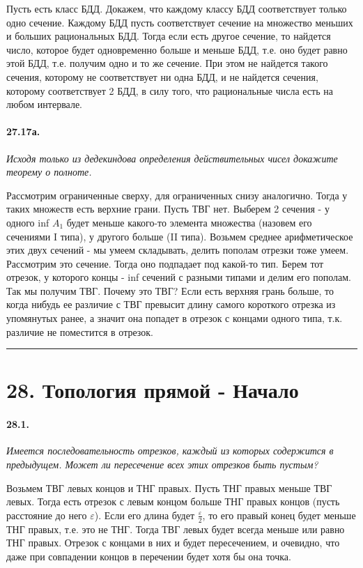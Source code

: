 \documentclass{book}
\begin{document}
Пусть есть класс БДД. Докажем, что каждому классу БДД соответствует только одно сечение. Каждому БДД пусть соответствует сечение на множество меньших и больших рациональных БДД. Тогда если есть другое сечение, то найдется число, которое будет одновременно больше и меньше БДД, т.е. оно будет равно этой БДД, т.е. получим одно и то же сечение. При этом не найдется такого сечения, которому не соответствует ни одна БДД, и не найдется сечения, которому соответствует 2 БДД, в силу того, что рациональные числа есть на любом интервале.

\paragraph{27.17а.}
\textit{Исходя только из дедекиндова определения действительных чисел докажите теорему о полноте.}

Рассмотрим ограниченные сверху, для ограниченных снизу аналогично. Тогда у таких множеств есть верхние грани. Пусть ТВГ нет. Выберем 2 сечения - у одного inf $A_1$ будет меньше какого-то элемента множества (назовем его сечениями I типа), у другого больше (II типа). Возьмем среднее арифметическое этих двух сечений - мы умеем складывать, делить пополам отрезки тоже умеем. Рассмотрим это сечение. Тогда оно подпадает под какой-то тип. Берем тот отрезок, у которого концы - inf сечений с разными типами и делим его пополам. Так мы получим ТВГ. Почему это ТВГ? Если есть верхняя грань больше, то когда нибудь ее различие с ТВГ превысит длину самого короткого отрезка  из упомянутых ранее, а значит она попадет в отрезок с концами одного типа, т.к. различие не поместится в отрезок.

\medskip\hrule\medskip
\section*{28. Топология прямой - Начало}

\paragraph{28.1.}
\textit{Имеется последовательность отрезков, каждый из которых содержится в предыдущем. Может ли пересечение всех этих отрезков быть пустым?}

Возьмем ТВГ левых концов и ТНГ правых. Пусть ТНГ правых меньше ТВГ левых. Тогда есть отрезок с левым концом больше ТНГ правых концов (пусть расстояние до него $\varepsilon$). Если его длина будет $\frac{\varepsilon}{2}$, то его правый конец будет меньше ТНГ правых, т.е. это не ТНГ. Тогда ТВГ левых будет всегда меньше или равно ТНГ правых. Отрезок с концами в них и будет пересечением, и очевидно, что даже при совпадении концов в перечении будет хотя бы она точка.
\end{document}
